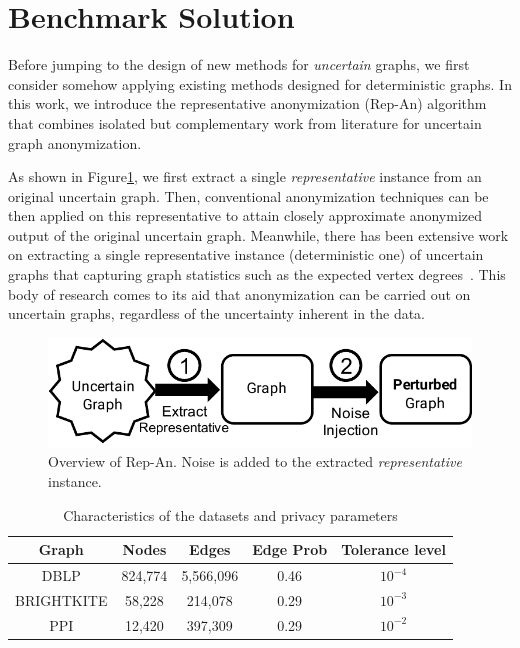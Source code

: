 \section{Benchmark Solution}
\label{sec:repOB}
Before jumping to the design of new methods for \emph{uncertain} graphs, we first consider somehow applying existing methods designed for deterministic graphs. 
In this work, we introduce the representative anonymization (Rep-An) algorithm that combines isolated but complementary work from literature for uncertain graph anonymization. 

As shown in Figure\ref{fig:repOB}, we first extract a single \emph{representative} instance from an original uncertain graph. Then, conventional anonymization techniques can be then applied on this representative to attain closely approximate anonymized output of the original uncertain graph. Meanwhile, there has been extensive work on extracting a single representative instance (deterministic one) of uncertain graphs that capturing graph statistics such as the expected vertex degrees~\cite{Parchas_Gullo_Papadias_Bonchi_2014}. This body of research comes to its aid that anonymization can be carried out on uncertain graphs, regardless of the uncertainty inherent in the data. 

\begin{figure}[t]
  \vspace{-1em}
    \captionsetup{margin=0cm}
    \centering  
        \includegraphics[width=0.95\columnwidth]{AddFigure/repOB.pdf}
        \vspace{-0.7em}
      \caption{Overview of Rep-An. Noise is added to the extracted \emph{representative} instance.}
    \label{fig:repOB}
    \vspace{-0.5em}
\end{figure}

\begin{table}[t]
    \centering
        \caption{Characteristics of the datasets and privacy parameters}
        \begin{tabular}{|c|c|c|c||c|}
        \hline 
        Graph    & Nodes    & Edges    &Edge Prob    & Tolerance level\\
        \hline  
        DBLP     &824,774   &5,566,096 & 0.46        & $10^{-4}$\\
        \small{BRIGHTKITE} &58,228   & 214,078 &0.29 &$10^{-3}$ \\
        PPI      &12,420   & 397,309  & 0.29         &$10^{-2}$\\
        \hline
        \end{tabular}
        \label{tab:dataset}
\end{table}

